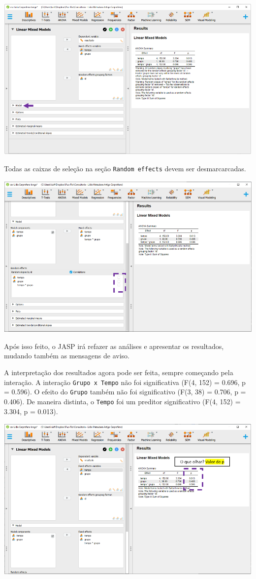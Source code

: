 \documentclass[
]{book}
\begin{document}
\includegraphics{./img/cap_lmm_model.png}

Todas as caixas de seleção na seção \texttt{Random\ effects} devem ser desmarcarcadas.

\includegraphics{./img/cap_lmm_model2.png}

Após isso feito, o JASP irá refazer as análises e apresentar os resultados, mudando também as mensagens de aviso.

A interpretação dos resultados agora pode ser feita, sempre começando pela interação. A interação \texttt{Grupo\ x\ Tempo} não foi significativa (F(4, 152) = 0.696, p = 0.596). O efeito do \texttt{Grupo} também não foi significativo (F(3, 38) = 0.706, p = 0.406). De maneira distinta, o \texttt{Tempo} foi um preditor significativo (F(4, 152) = 3.304, p = 0.013).

\includegraphics{./img/cap_lmm_resultados.png}
\end{document}
